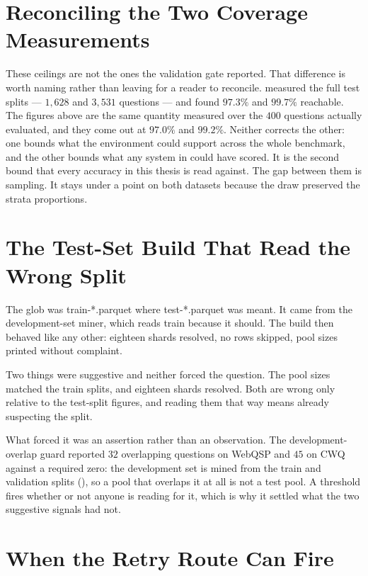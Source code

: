 \section{Reconciling the Two Coverage
Measurements}\label{app:ceiling-reconciliation}

These ceilings are not the ones the validation gate reported. That difference
is worth naming rather than leaving for a reader to reconcile.
 measured the full test splits --- $1{,}628$ and $3{,}531$
questions --- and found $97.3\%$ and $99.7\%$ reachable. The figures above are
the same quantity measured over the $400$ questions actually evaluated, and they
come out at $97.0\%$ and $99.2\%$. Neither corrects the other: one bounds what
the environment could support across the whole benchmark, and the other bounds
what any system in  could have scored. It is the second bound
that every accuracy in this thesis is read against. The gap between them is
sampling. It stays under a point on both datasets because the draw preserved
the strata proportions.


\section{The Test-Set Build That Read the Wrong
Split}\label{app:testset-nearmiss}

The glob was \textsf{train-*.parquet} where \textsf{test-*.parquet} was meant.
It came from the development-set miner, which reads train because it should.
The build then behaved like any other: eighteen shards resolved, no rows
skipped, pool sizes printed without complaint.

Two things were suggestive and neither forced the question. The pool sizes
matched the train splits, and eighteen shards resolved. Both are wrong only
relative to the test-split figures, and reading them that way means already
suspecting the split.

What forced it was an assertion rather than an observation. The
development-overlap guard reported $32$ overlapping questions on WebQSP and
$45$ on CWQ against a required zero: the development set is mined from the
train and validation splits (), so a pool that
overlaps it at all is not a test pool. A threshold fires whether or not anyone
is reading for it, which is why it settled what the two suggestive signals had
not.


\section{When the Retry Route Can Fire}\label{app:retry-budget}

